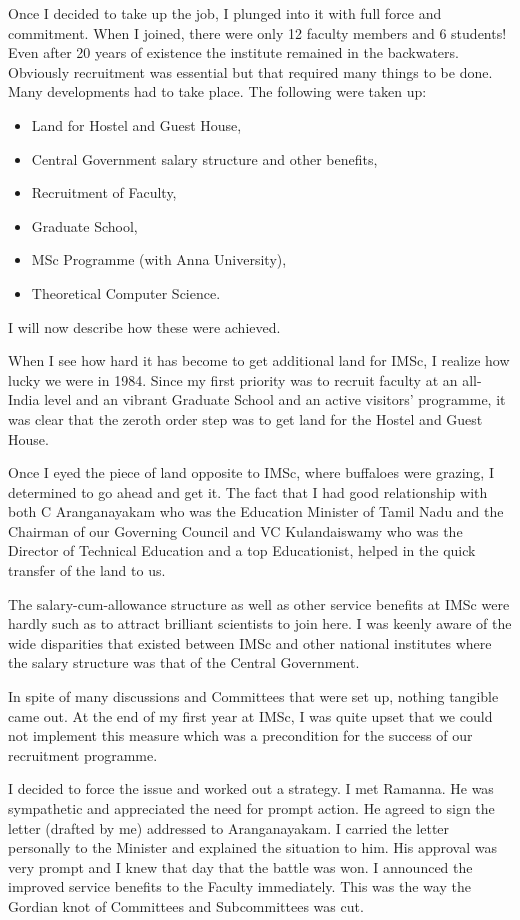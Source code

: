 Once I decided to take up the job, I plunged into it with full force and 
commitment. When I joined, there were only 12 faculty members and 6 
students! Even after 20 years of existence the institute remained in the 
backwaters. Obviously recruitment was essential but that required many 
things to be done. Many developments had to take place. The following 
were taken up:
\begin{itemize}
\item Land for Hostel and Guest House,
\item Central Government salary structure and other benefits,
\item Recruitment of Faculty,
\item Graduate School,
\item MSc Programme (with Anna University),
\item Theoretical Computer Science.
\end{itemize}

I will now describe how these were achieved. 

When I see how hard it has become to get additional land for IMSc, I 
realize how lucky we were in 1984. Since my first priority was to 
recruit faculty at an all-India level and an vibrant Graduate School and 
an active visitors' programme, it was clear that the zeroth order step 
was to get land for the Hostel and Guest House.

Once I eyed the piece of land opposite to IMSc, where buffaloes were 
grazing, I determined to go ahead and get it. The fact that I had good 
relationship with both C Aranganayakam who was the Education Minister of 
Tamil Nadu and the Chairman of our Governing Council and VC 
Kulandaiswamy who was the Director of Technical Education and a top 
Educationist, helped in the quick transfer of the land to us.

The salary-cum-allowance structure as well as other service benefits at 
IMSc were hardly such as to attract brilliant scientists to join here. I 
was keenly aware of the wide disparities that existed between IMSc and 
other national institutes where the salary structure was that of the 
Central Government.

In spite of many discussions and Committees that were set up, nothing 
tangible came out. At the end of my first year at IMSc, I was quite 
upset that we could not implement this measure which was a precondition 
for the success of our recruitment programme.

I decided to force the issue and worked out a strategy. I met Ramanna. 
He was sympathetic and appreciated the need for prompt action. He agreed 
to sign the letter (drafted by me) addressed to Aranganayakam. I carried 
the letter personally to the Minister and explained the situation to 
him. His approval was very prompt and I knew that day that the battle 
was won. I announced the improved service benefits to the Faculty 
immediately. This was the way the Gordian knot of Committees and 
Subcommittees was cut.

